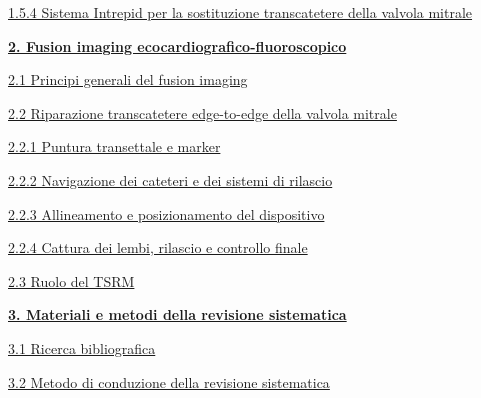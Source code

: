 \documentclass[12pt,a4paper,twoside]{article}
\begin{document}
\protect\hyperlink{sistema-intrepid-per-la-sostituzione-transcatetere-della-valvola-mitrale}{1.5.4 Sistema Intrepid per la sostituzione transcatetere della valvola mitrale}\dotfill\pageref{sistema-intrepid-per-la-sostituzione-transcatetere-della-valvola-mitrale}
\endgroup

\protect\hyperlink{fusion-imaging-ecocardiografico-fluoroscopico}{\textbf{2. Fusion imaging ecocardiografico-fluoroscopico}}\dotfill\pageref{fusion-imaging-ecocardiografico-fluoroscopico}

\begingroup\leftskip=1cm\relax
\protect\hyperlink{principi-generali-del-fusion-imaging}{2.1 Principi generali del fusion imaging}\dotfill\pageref{principi-generali-del-fusion-imaging}

\protect\hyperlink{riparazione-transcatetere-edge-to-edge-della-valvola-mitrale}{2.2 Riparazione transcatetere edge-to-edge della valvola mitrale}\dotfill\pageref{riparazione-transcatetere-edge-to-edge-della-valvola-mitrale}

\protect\hyperlink{puntura-transettale-e-marker}{2.2.1 Puntura transettale e marker}\dotfill\pageref{puntura-transettale-e-marker}

\protect\hyperlink{navigazione-dei-cateteri-e-dei-sistemi-di-rilascio}{2.2.2 Navigazione dei cateteri e dei sistemi di rilascio}\dotfill\pageref{navigazione-dei-cateteri-e-dei-sistemi-di-rilascio}

\protect\hyperlink{allineamento-e-posizionamento-del-dispositivo}{2.2.3 Allineamento e posizionamento del dispositivo}\dotfill\pageref{allineamento-e-posizionamento-del-dispositivo}

\protect\hyperlink{cattura-dei-lembi-rilascio-e-controllo-finale}{2.2.4 Cattura dei lembi, rilascio e controllo finale}\dotfill\pageref{cattura-dei-lembi-rilascio-e-controllo-finale}

\protect\hyperlink{ruolo-del-tsrm}{2.3 Ruolo del TSRM}\dotfill\pageref{ruolo-del-tsrm}
\endgroup

\protect\hyperlink{materiali-e-metodi-della-revisione-sistematica}{\textbf{3. Materiali e metodi della revisione sistematica}}\dotfill\pageref{materiali-e-metodi-della-revisione-sistematica}

\begingroup\leftskip=1cm\relax
\protect\hyperlink{ricerca-bibliografica}{3.1 Ricerca bibliografica}\dotfill\pageref{ricerca-bibliografica}

\protect\hyperlink{metodo-di-conduzione-della-revisione-sistematica}{3.2 Metodo di conduzione della revisione sistematica}\dotfill\pageref{metodo-di-conduzione-della-revisione-sistematica}
\end{document}
